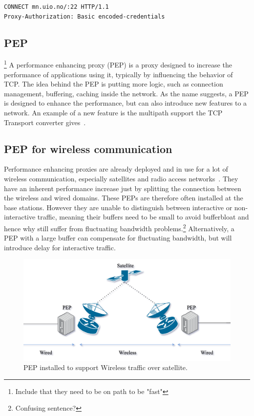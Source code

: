 \documentclass[a4paper,english, 11pt]{report}
\begin{document}
\begin{verbatim}
CONNECT mn.uio.no/:22 HTTP/1.1
Proxy-Authorization: Basic encoded-credentials
\end{verbatim}

\subsection{PEP}\footnote{Include that they need to be on path to be "fast"}
A performance enhancing proxy (PEP) is a proxy designed to increase the performance of applications using it, typically by influencing the behavior of TCP. The idea behind the PEP is putting more logic, such as connection management, buffering, caching inside the network. As the name suggests, a PEP is designed to enhance the performance, but can also introduce new features to a network. An example of a new feature is the multipath support the TCP Transport converter gives~\cite{rfc8803}.

\subsection{PEP for wireless communication}
Performance enhancing proxies are already deployed and in use for a lot of wireless communication, especially satellites and radio access networks~\cite{tcp_mmwave_proxy}. They have an inherent performance increase just by splitting the connection between the wireless and wired domains. These PEPs are therefore often installed at the base stations. However they are unable to distinguish between interactive or non-interactive traffic, meaning their buffers need to be small to avoid bufferbloat and hence why still suffer from fluctuating bandwidth problems.\footnote{Confusing sentence?} Alternatively, a PEP with a large buffer can compensate for fluctuating bandwidth, but will introduce delay for interactive traffic.

\begin{figure}[h] %
	\centering
	\includegraphics[scale=0.50]{../diagrams/drawio/pep_satellite.png}
  	\caption{PEP installed to support Wireless traffic over satellite.}
  	\label{fig:blockage}
\end{figure}
\end{document}
